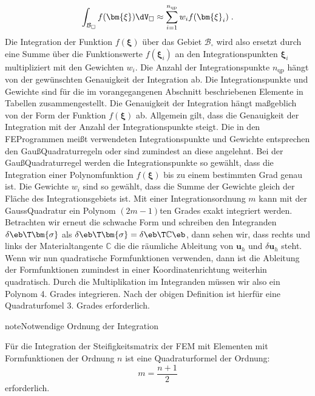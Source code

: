 \documentclass[letterpaper,10pt,german]{jupyterBook}
\begin{document}
\begin{equation*}
\begin{split}\int_{\mathcal{B}_{\square}} f(\bm{\xi}) \dV_{\square} \approx \sum_{i=1}^{n_{\text{qp}}} w_i f(\bm{\xi}_i) \; .\end{split}
\end{equation*}
\sphinxAtStartPar
Die Integration der Funktion \(f(\bm{\xi})\) über das Gebiet \(\mathcal{B}_{\square}\) wird also ersetzt durch eine Summe über die Funktionswerte \(f(\bm{\xi}_i)\) an den Integrationspunkten \(\bm{\xi}_i\) multipliziert mit den Gewichten \(w_i\). Die Anzahl der Integrationspunkte \(n_{\text{qp}}\) hängt von der gewünschten Genauigkeit der Integration ab. Die Integrationspunkte und Gewichte sind für die im vorangegangenen Abschnitt beschriebenen Elemente in Tabellen zusammengestellt. Die Genauigkeit der Integration hängt maßgeblich von der Form der Funktion \(f(\bm{\xi})\) ab. Allgemein gilt, dass die Genauigkeit der Integration mit der Anzahl der Integrationspunkte steigt. Die in den FE\sphinxhyphen{}Programmen meißt verwendeten Integrationspunkte und Gewichte entsprechen den Gauß\sphinxhyphen{}Quadraturregeln oder sind zumindest an diese angelehnt. Bei der Gauß\sphinxhyphen{}Quadraturregel werden die Integrationspunkte so gewählt, dass die Integration einer Polynomfunktion \(f(\bm{\xi})\) bis zu einem bestimmten Grad genau ist. Die Gewichte \(w_i\) sind so gewählt, dass die Summe der Gewichte gleich der Fläche des Integrationsgebiets ist. Mit einer Integrationsordnung \(m\) kann mit der Gauss\sphinxhyphen{}Quadratur ein Polynom \((2m − 1)\)\sphinxhyphen{}ten Grades exakt integriert werden.
Betrachten wir erneut die schwache Form und schreiben den Integranden \(\delta\eb\T  \bm{\sigma}\) als \(\delta\eb\T  \bm{\sigma} = \delta\eb\T  \mathbb{C} \eb\), dann sehen wir, dass rechts und links der Materialtangente \(\mathbb{C}\) die die räumliche Ableitung von \(\bm{u}_h\) und \(\delta\bm{u}_h\) steht. Wenn wir nun quadratische Formfunktionen verwenden, dann ist die Ableitung der Formfunktionen zumindest in einer Koordinatenrichtung weiterhin quadratisch. Durch die Multiplikation im Integranden müssen wir also ein Polynom 4. Grades integrieren. Nach der obigen Definition ist hierfür eine Quadraturfomel 3. Grades erforderlich.

\begin{sphinxadmonition}{note}{Notwendige Ordnung der Integration}

\sphinxAtStartPar
Für die Integration der Steifigkeitsmatrix der FEM mit Elementen mit Formfunktionen der Ordnung \(n\) ist eine Quadraturformel der Ordnung:
\begin{equation*}
 m = \frac{n+1}{2} 
 \end{equation*}
\sphinxAtStartPar
erforderlich.
\end{sphinxadmonition}
\end{document}
